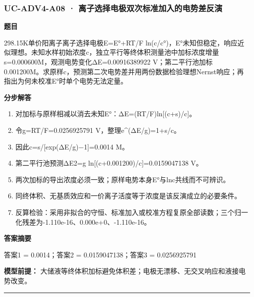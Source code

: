 \documentclass[UTF8,11pt,a4paper]{ctexart}
\begin{document}
\subsubsection*{UC-ADV4-A08 · 离子选择电极双次标准加入的电势差反演}
\noindent\textbf{题目}\par
298.15K单价阳离子离子选择电极E=E°+RT/F ln(c/c°)，E°未知但稳定，响应近似理想。未知水样初始浓度c，独立平行等终体积测量池中加标浓度增量s=0.000600M，观测电势变化ΔE=0.00916389922 V；第二平行池加标0.001200M。求原样c，预测第二次电势差并用两份数据检验理想Nernst响应；再指出为何未校准E°时单个电势无法定量。\par
\medskip\noindent\textbf{分步解答}
\begin{enumerate}
\item 对加标与原样相减以消去未知E°：ΔE=(RT/F)ln[(c+s)/c]。
\item 令g=RT/F=0.0256925791 V，整理e\textasciicircum{}(ΔE/g)=1+s/c。
\item 因此c=s/[exp(ΔE/g)−1]=0.0014 M。
\item 第二平行池预测ΔE2=g ln[(c+0.001200)/c]=0.0159047138 V。
\item 两次加标的导出浓度必须一致；原样电势本身E°与lnc共线而不可辨识。
\item 同终体积、无基质效应和一价离子活度等于浓度是该反演成立的必要条件。
\item 反算检验：采用非拟合的守恒、标准加入或校准方程复原全部读数；三个归一化残差为-1.110e-16、0.000e+0、-1.110e-16。
\end{enumerate}
\noindent\textbf{答案摘要}\par
答案1 = 0.0014；答案2 = 0.0159047138；答案3 = 0.0256925791\par
\noindent\textbf{模型前提：}
大储液等终体积加标避免体积差；电极无漂移、无交叉响应和液接电势改变。\par
\medskip\hrule\medskip
{}
\end{document}
